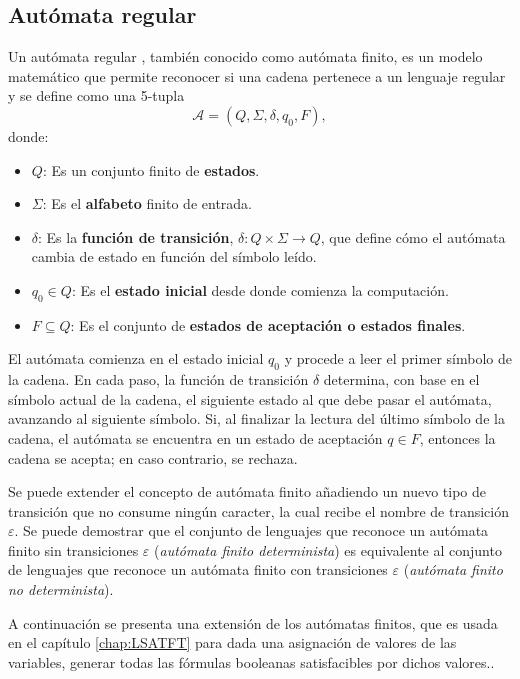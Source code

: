 \documentclass[12pt]{article}
\begin{document}
\subsection{Autómata regular}

Un autómata regular \cite{authomataTheory}, también conocido como autómata finito, es un modelo matemático que 
permite reconocer si una cadena pertenece a un lenguaje regular y se define como una 5-tupla $$\mathcal{A} = (Q, \Sigma, \delta, q_0, F),$$ donde:

\begin{itemize}
  \item $Q$: Es un conjunto finito de \textbf{estados}.
  \item $\Sigma$: Es el \textbf{alfabeto} finito de entrada.
  \item $\delta$: Es la \textbf{función de transición}, $\delta: Q \times \Sigma \to Q$, que define cómo el autómata cambia de estado en función del símbolo leído.
  \item $q_0 \in Q$: Es el \textbf{estado inicial} desde donde comienza la computación.
  \item $F \subseteq Q$: Es el conjunto de \textbf{estados de aceptación o estados finales}.
\end{itemize}

El autómata comienza en el estado inicial $q_0$ y procede a leer el primer símbolo de la cadena.
En cada paso, la función de transición $\delta$ determina, con base en el símbolo actual de la cadena, el siguiente estado al que debe pasar el autómata, avanzando al siguiente símbolo.
Si, al finalizar la lectura del último símbolo de la cadena, el autómata se encuentra en un estado de aceptación 
$q \in F$, entonces la cadena se acepta; en caso contrario, se rechaza.

Se puede extender el concepto de autómata finito añadiendo un nuevo tipo de transición que no consume ningún caracter, 
la cual recibe el nombre de transición $\varepsilon$. Se puede demostrar \cite{authomataTheory} que el 
conjunto de lenguajes que reconoce un autómata finito sin transiciones $\varepsilon$
(\textit{autómata finito determinista}) es equivalente al conjunto de lenguajes que reconoce 
un autómata finito con transiciones $\varepsilon$ (\textit{autómata finito no determinista}).

A continuación se presenta una extensión de los autómatas finitos, que es usada en el
capítulo \ref{chap:LSATFT} para dada una asignación de valores de las variables, generar todas las fórmulas
booleanas satisfacibles por dichos valores..
\end{document}
